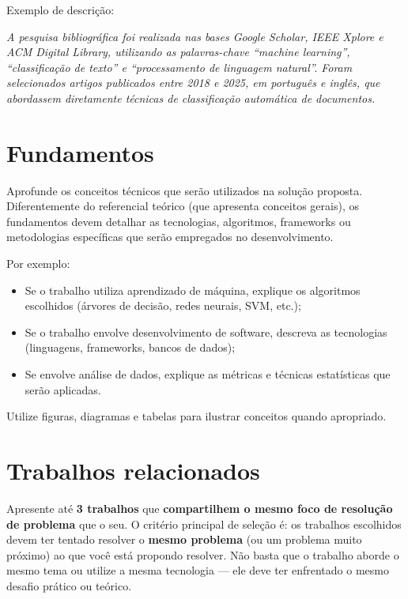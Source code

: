 \documentclass[
    12pt,                %
    openright,           %
    oneside,             %
    a4paper,             %
    english,             %
    brazil               %
]{abntex2}
\begin{document}
Exemplo de descrição:

\textit{A pesquisa bibliográfica foi realizada nas bases Google Scholar, IEEE Xplore e ACM Digital Library, utilizando as palavras-chave ``machine learning'', ``classificação de texto'' e ``processamento de linguagem natural''. Foram selecionados artigos publicados entre 2018 e 2025, em português e inglês, que abordassem diretamente técnicas de classificação automática de documentos.}

\section{Fundamentos}
\label{sec:fundamentos}

Aprofunde os conceitos técnicos que serão utilizados na solução proposta. Diferentemente do referencial teórico (que apresenta conceitos gerais), os fundamentos devem detalhar as tecnologias, algoritmos, frameworks ou metodologias específicas que serão empregados no desenvolvimento.

Por exemplo:
\begin{itemize}
    \item Se o trabalho utiliza aprendizado de máquina, explique os algoritmos escolhidos (árvores de decisão, redes neurais, SVM, etc.);
    \item Se o trabalho envolve desenvolvimento de software, descreva as tecnologias (linguagens, frameworks, bancos de dados);
    \item Se envolve análise de dados, explique as métricas e técnicas estatísticas que serão aplicadas.
\end{itemize}

Utilize figuras, diagramas e tabelas para ilustrar conceitos quando apropriado.

\section{Trabalhos relacionados}
\label{sec:trabalhos_relacionados}

Apresente até \textbf{3 trabalhos} que \textbf{compartilhem o mesmo foco de resolução de problema} que o seu. O critério principal de seleção é: os trabalhos escolhidos devem ter tentado resolver o \textbf{mesmo problema} (ou um problema muito próximo) ao que você está propondo resolver. Não basta que o trabalho aborde o mesmo tema ou utilize a mesma tecnologia --- ele deve ter enfrentado o mesmo desafio prático ou teórico.
\end{document}
